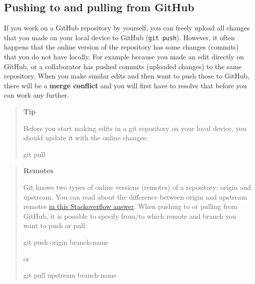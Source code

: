 \documentclass[
  letterpaper,
  DIV=11,
  numbers=noendperiod,
  oneside]{scrreprt}
\newenvironment{Shaded}{\begin{snugshade}}{\end{snugshade}}
\newcommand{\FunctionTok}[1]{\textcolor[rgb]{0.28,0.35,0.67}{#1}}
\newcommand{\NormalTok}[1]{\textcolor[rgb]{0.00,0.23,0.31}{#1}}
\begin{document}
\begin{tcolorbox}
\section{Pushing to and pulling from
GitHub}\label{pushing-to-and-pulling-from-github}

If you work on a GitHub repository by yourself, you can freely upload
all changes that you made on your local device to GitHub
(\texttt{git\ push}). However, it often happens that the online version
of the repository has some changes (commits) that you do not have
locally. For example because you made an edit directly on GitHub, or a
collaborator has pushed commits (uploaded changes) to the same
repository. When you make similar edits and then want to push those to
GitHub, there will be a \textbf{merge conflict} and you will first have
to resolve that before you can work any further.

\begin{quote}
\textbf{Tip}

Before you start making edits in a git repository on your local device,
you should update it with the online changes:

\begin{Shaded}
\begin{Highlighting}[]
\FunctionTok{git}\NormalTok{ pull}
\end{Highlighting}
\end{Shaded}
\end{quote}

\begin{quote}
\textbf{Remotes}

Git knows two types of online versions (remotes) of a repository: origin
and upstream. You can read about the difference between origin and
upstream remotes \href{https://stackoverflow.com/a/9257901}{in this
Stackoverflow answer}. When pushing to or pulling from GitHub, it is
possible to specify from/to which remote and branch you want to push or
pull:

\begin{Shaded}
\begin{Highlighting}[]
\FunctionTok{git}\NormalTok{ push origin branch{-}name}
\end{Highlighting}
\end{Shaded}

or

\begin{Shaded}
\begin{Highlighting}[]
\FunctionTok{git}\NormalTok{ pull upstream branch{-}name}
\end{Highlighting}
\end{Shaded}
\end{quote}


\end{tcolorbox}
\end{document}
